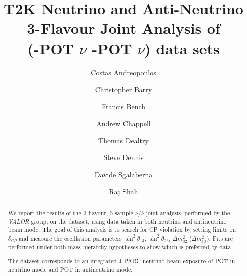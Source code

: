 %
%

\begin{frontmatter}
\title{
  T2K Neutrino and Anti-Neutrino 3-Flavour Joint Analysis of  \\
  \RunPeriod (\TotalPotNuRunOneNineC-POT $\nu$  \TotalPotNuBarRunOneNineC-POT $\bar{\nu}$)
  data sets
}
\author[RAL,LIV]  {Costas Andreopoulos}
\author[LIV]  {Christopher Barry}
\author[LIV]  {Francis Bench}
\author[WAR]  {Andrew Chappell}
\author[LANCS]  {Thomas Dealtry}
\author[RAL,LIV]  {Steve Dennis}
\author[GEN]     {Davide Sgalaberna}
\author[RAL,OXF]  {Raj Shah}

\address[RAL]   {Science \& Technology Facilities Council (STFC), Rutherford Appleton Laboratory,\\ Harwell Oxford Campus, OX11 0QX, UK}
\address[LIV]   {University of Liverpool, Physics Department,\\ Liverpool, L69 7ZE, UK} 
\address[OXF]   {University of Oxford, Subdepartment of Particle Physics,\\ Oxford, OX1 3RH, UK}
\address[WAR]   {University of Warwick, Physics Department,\\ Coventry, CV4 7AL, UK}
\address[LANCS] {Lancaster University, Physics Department,\\ Lancaster, LA1 4YB, UK}
\address[GEN]  {University of Geneva, Departement de physique nucleaire et corpusculaire,\\ 1211 Geneve, Switzerland}

%
%

\begin{abstract}

We report the results of the 3-flavour, 5 sample $\nu/\bar{\nu}$ joint analysis, performed by the {\em VALOR} group, on the \RunPeriod dataset, using data taken in both neutrino and antineutrino beam mode. The goal of this analysis is to search for CP violation by setting limits on $\delta_{CP}$ and measure the oscillation parameters $\sin^2 \theta_{13}$, $\sin^2 \theta_{23}$, $\Delta m^2_{32}$ ($\Delta m^2_{13}$). Fits are performed under both mass hierarchy hypotheses to show which is preferred by data.

The \RunPeriod dataset corresponds to an integrated J-PARC neutrino beam exposure of \TotalPotNu{} POT in neutrino mode and \TotalPotNuBar{} POT in antineutrino mode.


\end{abstract}
\end{frontmatter}

